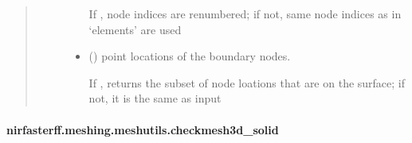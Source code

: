 \documentclass[letterpaper,10pt,english]{sphinxmanual}
\begin{document}
\begin{fulllineitems}
\begin{quote}
\begin{description}
\begin{itemize}
\sphinxAtStartPar
If , node indices are renumbered; if not, same node indices as in ‘elements’ are used

\item {} 
\sphinxAtStartPar
{} () \textendash{} point locations of the boundary nodes.

\sphinxAtStartPar
If , returns the subset of node loations that are on the surface; if not, it is the same as input 

\end{itemize}


\end{description}\end{quote}

\end{fulllineitems}


\sphinxstepscope


\paragraph{nirfasterff.meshing.meshutils.checkmesh3d\_solid}
\label{\detokenize{_autosummary/nirfasterff.meshing.meshutils.checkmesh3d_solid:nirfasterff-meshing-meshutils-checkmesh3d-solid}}\label{\detokenize{_autosummary/nirfasterff.meshing.meshutils.checkmesh3d_solid::doc}}
\end{document}

